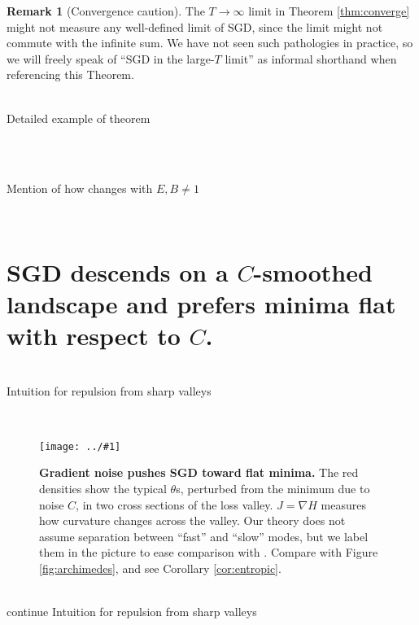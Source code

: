\documentclass[openany, notitlepage, justified]{tufte-book}
\newcommand{\moolor}[2]{\par\hrulefill\\#2\vspace{#1 cm}\par\hrulefill\\}
\theoremstyle{plain}
\theoremstyle{definition}
\newtheorem{rmk}{Remark}
\newcommand{\plotmoow}[3]{\texttt{[image: ../\#1]}}
\begin{document}
        \begin{rmk}[Convergence caution]
            The $T\to \infty$ limit in Theorem \ref{thm:converge} might
            not measure any well-defined limit of SGD, since the limit might not
            commute with the infinite sum.  We have not seen such pathologies in
            practice, so we will freely speak of ``SGD in the large-$T$ limit'' as
            informal shorthand when referencing this Theorem.
        \end{rmk}

        \moolor{5}{Detailed example of theorem}
        \moolor{1}{Mention of how changes with $E,B \neq 1$}
      
    \section{SGD descends on a $C$-smoothed landscape and prefers
        minima flat with respect to $C$.}

        \moolor{2}{Intuition for repulsion from sharp valleys}
        \begin{figure}
            \centering
            \plotmoow{diagrams/entropic-force-diagram}{0.5\columnwidth}{} 
            \caption{%
                \textbf{ Gradient noise pushes SGD toward flat minima.} The
                red densities show the typical $\theta$s, perturbed from
                the minimum due to noise $C$, in two cross sections of the
                loss valley.  $J = \nabla H$ measures how curvature changes
                across the valley.  Our theory does not assume separation
                between ``fast'' and ``slow'' modes, but we label them in
                the picture to ease comparison with \citep{we19b}.  Compare
                with Figure \ref{fig:archimedes}, and see Corollary
                \ref{cor:entropic}.
            }
            \label{fig:cubic}
        \end{figure}
        \moolor{2}{continue Intuition for repulsion from sharp valleys}
    
\end{document}
